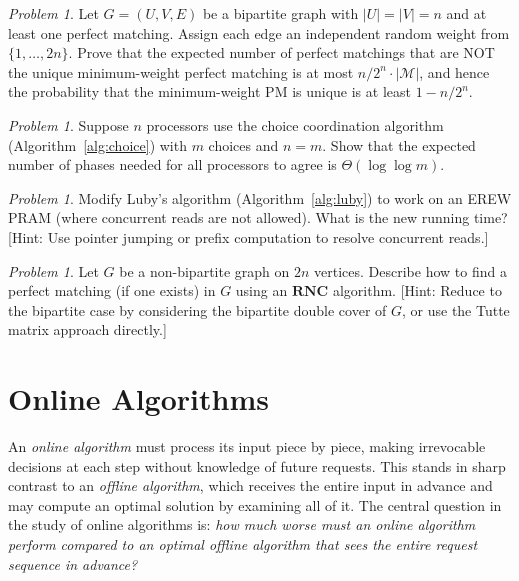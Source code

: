 \documentclass[twoside,12pt]{book}
\theoremstyle{plain}
\theoremstyle{definition}
\theoremstyle{remark}
\newtheorem{problem}[theorem]{Problem}
\begin{document}
\begin{problem}
\label{prob:isolating}
Let $G = (U, V, E)$ be a bipartite graph with $|U| = |V| = n$ and at least one perfect matching. Assign each edge an independent random weight from $\{1, \ldots, 2n\}$. Prove that the expected number of perfect matchings that are NOT the unique minimum-weight perfect matching is at most $n/2^n \cdot |\mathcal{M}|$, and hence the probability that the minimum-weight PM is unique is at least $1 - n/2^n$.
\end{problem}

\begin{problem}
\label{prob:choice-load}
Suppose $n$ processors use the choice coordination algorithm (Algorithm~\ref{alg:choice}) with $m$ choices and $n = m$. Show that the expected number of phases needed for all processors to agree is $\Theta(\log \log m)$.
\end{problem}

\begin{problem}
\label{prob:mis-erew}
Modify Luby's algorithm (Algorithm~\ref{alg:luby}) to work on an EREW PRAM (where concurrent reads are not allowed). What is the new running time? [Hint: Use pointer jumping or prefix computation to resolve concurrent reads.]
\end{problem}

\begin{problem}
\label{prob:perfect-matching-rnc}
Let $G$ be a non-bipartite graph on $2n$ vertices. Describe how to find a perfect matching (if one exists) in $G$ using an $\mathbf{RNC}$ algorithm. [Hint: Reduce to the bipartite case by considering the bipartite double cover of $G$, or use the Tutte matrix approach directly.]
\end{problem}


\chapter{Online Algorithms}
\label{ch:online-algorithms}

An \emph{online algorithm} must process its input piece by piece, making
irrevocable decisions at each step without knowledge of future requests.
This stands in sharp contrast to an \emph{offline algorithm}, which
receives the entire input in advance and may compute an optimal solution
by examining all of it.  The central question in the study of online
algorithms is: \emph{how much worse must an online algorithm perform
compared to an optimal offline algorithm that sees the entire request
sequence in advance?}
\end{document}
